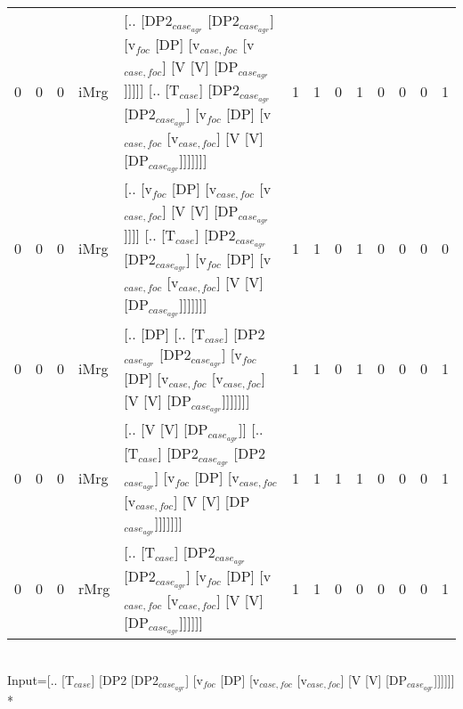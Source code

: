\begin{tabularx}{\linewidth}{rrrlXrrrrrrrr}
   0 &       0 &   0 & iMrg & [.. [DP2$_{case_{agr}}$ [DP2$_{case_{agr}}$] [v$_{foc}$ [DP] [v$_{case,foc}$ [v$_{case,foc}$] [V [V] [DP$_{case_{agr}}$]]]]] [.. [T$_{case}$] [DP2$_{case_{agr}}$ [DP2$_{case_{agr}}$] [v$_{foc}$ [DP] [v$_{case,foc}$ [v$_{case,foc}$] [V [V] [DP$_{case_{agr}}$]]]]]]] &             1 &             1 &                  0 &            1 &              0 &             0 &              0 &          1 \\
   0 &       0 &   0 & iMrg & [.. [v$_{foc}$ [DP] [v$_{case,foc}$ [v$_{case,foc}$] [V [V] [DP$_{case_{agr}}$]]]] [.. [T$_{case}$] [DP2$_{case_{agr}}$ [DP2$_{case_{agr}}$] [v$_{foc}$ [DP] [v$_{case,foc}$ [v$_{case,foc}$] [V [V] [DP$_{case_{agr}}$]]]]]]]                               &             1 &             1 &                  0 &            1 &              0 &             0 &              0 &          0 \\
   0 &       0 &   0 & iMrg & [.. [DP] [.. [T$_{case}$] [DP2$_{case_{agr}}$ [DP2$_{case_{agr}}$] [v$_{foc}$ [DP] [v$_{case,foc}$ [v$_{case,foc}$] [V [V] [DP$_{case_{agr}}$]]]]]]]                                                                                       &             1 &             1 &                  0 &            1 &              0 &             0 &              0 &          1 \\
   0 &       0 &   0 & iMrg & [.. [V [V] [DP$_{case_{agr}}$]] [.. [T$_{case}$] [DP2$_{case_{agr}}$ [DP2$_{case_{agr}}$] [v$_{foc}$ [DP] [v$_{case,foc}$ [v$_{case,foc}$] [V [V] [DP$_{case_{agr}}$]]]]]]]                                                                      &             1 &             1 &                  1 &            1 &              0 &             0 &              0 &          1 \\
   0 &       0 &   0 & rMrg & [.. [T$_{case}$] [DP2$_{case_{agr}}$ [DP2$_{case_{agr}}$] [v$_{foc}$ [DP] [v$_{case,foc}$ [v$_{case,foc}$] [V [V] [DP$_{case_{agr}}$]]]]]]                                                                                                 &             1 &             1 &                  0 &            0 &              0 &             0 &              0 &          1 \\
\hline
\end{tabularx}\endgroup\\
\begingroup\scriptsize Input=[.. [T$_{case}$] [DP2 [DP2$_{case_{agr}}$] [v$_{foc}$ [DP] [v$_{case,foc}$ [v$_{case,foc}$] [V [V] [DP$_{case_{agr}}$]]]]]]\\*
